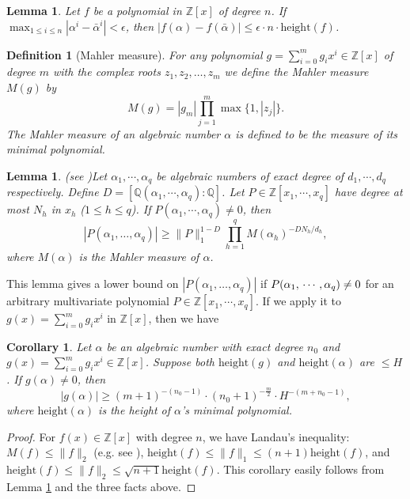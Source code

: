 \documentclass{sig-alternate}
\newtheorem{lem}[theorem]{Lemma}
\newtheorem{cor}[theorem]{Corollary}
\newtheorem{defn}[theorem]{Definition}
\numberwithin{theorem}{section} \numberwithin{equation}{section}
\begin{document}
\begin{lem}\label{lem:approximation-of-f}
Let $f$ be a polynomial in $\mathbb{Z}[x]$ of degree $n$. If
$\max_{1\leq i\leq n}|\alpha^{i}-\bar{\alpha}^{i}| < \epsilon$, then
$     |f(\alpha)-f(\bar{\alpha})| \leq  \epsilon \cdot n \cdot
     \mbox{height}(f)$.
\end{lem}

\begin{defn}[Mahler measure]
For any polynomial $g=\sum_{i=0}^{m}g_{i}x^{i}\in\mathbb{Z}[x]$ of
degree $m$ with the complex roots $z_{1},z_{2},\dots,z_{m}$ we
define the Mahler measure $M(g)$ by
\[
M(g)=|g_{m}|\prod_{j=1}^{m}\max\{1, |z_{j}| \}.
\]
The Mahler measure of an algebraic number $\alpha$ is defined to be
the measure of its minimal polynomial.
\end{defn}

\begin{lem}(see \cite[Lemma 3]{MW1978})\label{lem:Mignotte}
Let $\alpha_{1}, \cdots, \alpha_{q}$ be algebraic numbers of exact
degree of $d_{1}, \cdots, d_{q}$ respectively. Define
$D=[\mathbb{Q}(\alpha_{1}, \cdots, \alpha_{q}):\mathbb{Q}]$. Let $P
\in \mathbb{Z}[x_{1}, \cdots, x_{q}]$ have degree at most $N_{h}$ in
$x_{h}$ ($1\leq h\leq q$). If $P(\alpha_{1}, \cdots, \alpha_{q})
\neq  0$, then
\[
|P(\alpha_{1},\dots,\alpha_{q})| \geq  \|
P\|_{1}^{1-D}\prod_{h=1}^{q}M(\alpha_{h})^{-DN_{h}/d_{h}},
\]
where $M(\alpha)$ is the Mahler measure of $\alpha$.
\end{lem}



This lemma gives a lower bound on $|P(\alpha_{1}, \dots,
\alpha_{q})|$ if $P(\alpha_{1},\\\cdots, \alpha_{q}) \neq  0$ for an
arbitrary multivariate polynomial $P\in \mathbb{Z}[x_{1}, \cdots,
x_{q}]$. If we apply it to $g(x) = \sum_{i=0}^m g_i x^i$ in
$\mathbb{Z}[x]$, then we have
\begin{cor}\label{cor:g(alpha)not equal to 0}
Let $\alpha$ be an algebraic number with exact degree $n_0$ and
$g(x) = \sum_{i=0}^m g_i x^i \in \mathbb{Z}[x]$. Suppose both
$\mbox{height}(g)$ and $\mbox{height}(\alpha)$ are $\leq H$. If
$g(\alpha) \neq 0$, then
\[|g(\alpha)|  \geq (m +
1)^{-(n_0-1)}\cdot(n_0+1)^{-\frac{m}{2}}\cdot H^{-(m+n_0-1)},\]
where $\mbox{height}(\alpha)$ is the height of $\alpha$'s minimal
polynomial.
\end{cor}

\begin{proof}
For $f(x) \in \mathbb{Z}[x]$ with degree $n$, we
have Landau's inequality: $M(f) \leq \|f\|_2$ (e.g. see \cite[p.
154]{GG1999}), $\mbox{height}(f) \leq \|f\|_1 \leq
(n+1)\mbox{height}(f)$, and $\mbox{height}(f) \leq \|f\|_2 \leq
\sqrt{n+1}\mbox{height}(f)$.
This corollary  easily follows from Lemma \ref{lem:Mignotte} and the
three facts above.
\end{proof}
\end{document}
